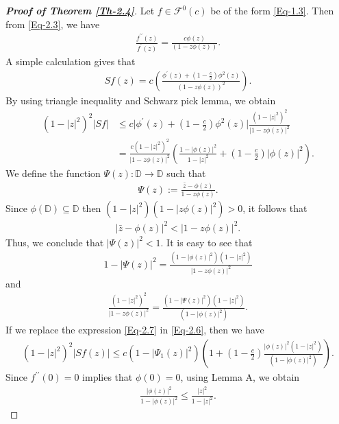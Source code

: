 \documentclass[a4paper,12pt]{amsart}
\theoremstyle{plain}
\theoremstyle{definition}
\theoremstyle{plain}
\begin{document}
	\begin{proof}[\bf Proof of Theorem \ref{Th-2.4}]
		Let $f\in\mathcal{F}^0(c)$ be of the form \eqref{Eq-1.3}. Then from \eqref{Eq-2.3}, we have
		\begin{align*}
			\frac{f^{\prime\prime}(z)}{f^{\prime}(z)}=\frac{c\phi(z)}{(1-z\phi(z))}.
		\end{align*}
		A simple calculation gives that
		\begin{align*}
			Sf(z)=c\left(\frac{\phi^{\prime}(z)+\left(1-\frac{c}{2}\right)\phi^2(z)}{(1-z\phi(z))^2}\right).
		\end{align*}
		By using triangle inequality and Schwarz pick lemma, we obtain
		\begin{align}\label{Eq-2.6}
			(1-|z|^2)^2|Sf|&\leq c\bigg|\phi^{\prime}(z)+\left(1-\frac{c}{2}\right)\phi^2(z)\bigg|\frac{(1-|z|^2)^2}{|1-z\phi(z)|^2}\\&\nonumber=\frac{c(1-|z|^2)^2}{|1-z\phi(z)|^2}\left(\frac{1-|\phi(z)|^2}{1-|z|^2}+\left(1-\frac{c}{2}\right)|\phi(z)|^2\right).
		\end{align}
		We define the function $\Psi(z):\mathbb{D}\rightarrow\mathbb{D}$ such that
		\begin{align*}
			\Psi(z):=\frac{\bar{z}-\phi(z)}{1-z\phi(z)}.
		\end{align*}
		Since $\phi(\mathbb{D})\subseteq\mathbb{D}$ then $(1-|z|^2)(1-|z\phi(z)|^2)>0$, it follows that 
		\begin{align*}
			|\bar{z}-\phi(z)|^2<|1-z\phi(z)|^2.
		\end{align*}
		Thus, we conclude  that $|\Psi(z)|^2<1$. It is easy to see that
		\begin{align*}
			1-|\Psi(z)|^2=\frac{(1-|\phi(z)|^2)(1-|z|^2)}{|1-z\phi(z)|^2}
		\end{align*}
		and
		\begin{align}\label{Eq-2.7}
			\frac{(1-|z|^2)^2}{|1-z\phi(z)|^2}=\frac{(1-|\Psi(z)|^2)(1-|z|^2)}{(1-|\phi(z)|^2)}.
		\end{align}
		If we replace the expression \eqref{Eq-2.7} in \eqref{Eq-2.6}, then we have
		\begin{align}\label{Eq-2.8}
			(1-|z|^2)^2|Sf(z)|\leq c(1-|\Psi_1(z)|^2)\left(1+\left(1-\frac{c}{2}\right)\frac{|\phi(z)|^2(1-|z|^2)}{(1-|\phi(z)|^2)}\right).
		\end{align}
		Since $f^{\prime\prime}(0)=0$ implies that $\phi(0)=0$, using Lemma A, we obtain
		\begin{align}\label{Eq-2.9}
			\frac{|\phi(z)|^2}{1-|\phi(z)|^2}\leq\frac{|z|^2}{1-|z|^2}.
		\end{align}

\end{proof}
\end{document}
